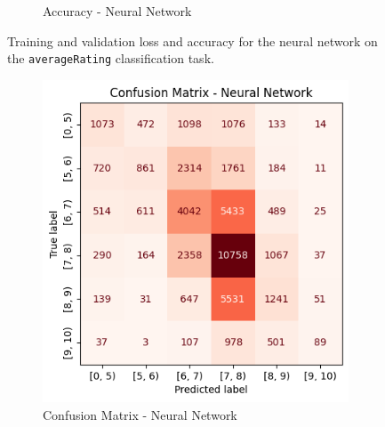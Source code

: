 \begin{figure}[H]
\begin{subfigure}[b]{0.48\textwidth}
        \caption{Accuracy - Neural Network}
        \label{fig:accuracy_nn_rating}
    \end{subfigure}
    \caption{Training and validation loss and accuracy for the neural network on the \texttt{averageRating} classification task.}
    \label{fig:nn_performance_rating}
\end{figure}

\begin{figure}[H]
    \centering
    \begin{subfigure}[b]{0.45\textwidth}
        \centering
        \includegraphics[width=\textwidth]{plotsss/cm_nn_rating.png}
        \caption{Confusion Matrix - Neural Network}
        \label{fig:cm_nn_rating}
    \end{subfigure}
    \hfill
    \begin{subfigure}[b]{0.53\textwidth}
        \centering

\end{subfigure}
\end{figure}
